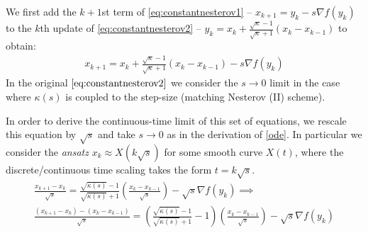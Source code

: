   We first add the $k+1$st term of \eqref{eq:constantnesterov1} -- $x_{k+1} = y_k - s \nabla f(y_k)$ to the $k$th update of \eqref{eq:constantnesterov2} -- $y_k = x_k + \frac{\sqrt{\kappa}-1}{\sqrt{\kappa}+1} (x_k - x_{k-1})$ to obtain:
 \begin{align*}
     x_{k+1} = x_{k} + \frac{\sqrt{\kappa}-1}{\sqrt{\kappa}+1}(x_{k}-x_{k-1}) - s \nabla f(y_k)
 \end{align*}
 In the original $\eqref{eq:constantnesterov2}$ we consider the $s \to 0$ limit in the case where $\kappa(s)$ is coupled to the step-size (matching Nesterov (II) scheme).
 

 
 In order to derive the continuous-time limit of this set of equations, we rescale this equation by $\sqrt{s}$ and take $s \to 0$ as in the derivation of \eqref{ode}. In particular we consider the \textit{ansatz} $x_k \approx X(k \sqrt{s})$ for some smooth curve $X(t)$, where the discrete/continuous time scaling takes the form $t = k \sqrt{s}$.
 \begin{align*}
    \frac{x_{k+1}-x_k}{\sqrt{s}} = \frac{\sqrt{\kappa(s)}-1}{\sqrt{\kappa(s)}+1} \left( \frac{x_{k}-x_{k-1}}{\sqrt{s}} \right) - \sqrt{s} \nabla f(y_k) \implies \\
    \frac{(x_{k+1}-x_k)-(x_{k}-x_{k-1})}{\sqrt{s}} = (\frac{\sqrt{\kappa(s)}-1}{\sqrt{\kappa(s)}+1}-1) \left( \frac{x_{k}-x_{k-1}}{\sqrt{s}} \right) - \sqrt{s} \nabla f(y_k)
 \end{align*}
 
